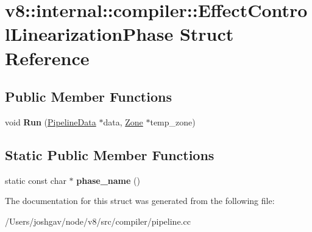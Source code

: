\hypertarget{structv8_1_1internal_1_1compiler_1_1_effect_control_linearization_phase}{}\section{v8\+:\+:internal\+:\+:compiler\+:\+:Effect\+Control\+Linearization\+Phase Struct Reference}
\label{structv8_1_1internal_1_1compiler_1_1_effect_control_linearization_phase}
\subsection*{Public Member Functions}
\begin{DoxyCompactItemize}
\item 
void {\bfseries Run} (\hyperlink{classv8_1_1internal_1_1compiler_1_1_pipeline_data}{Pipeline\+Data} $\ast$data, \hyperlink{classv8_1_1internal_1_1_zone}{Zone} $\ast$temp\+\_\+zone)\hypertarget{structv8_1_1internal_1_1compiler_1_1_effect_control_linearization_phase_ac70bbeaf7ea05b8135044605b4eb6a99}{}\label{structv8_1_1internal_1_1compiler_1_1_effect_control_linearization_phase_ac70bbeaf7ea05b8135044605b4eb6a99}

\end{DoxyCompactItemize}
\subsection*{Static Public Member Functions}
\begin{DoxyCompactItemize}
\item 
static const char $\ast$ {\bfseries phase\+\_\+name} ()\hypertarget{structv8_1_1internal_1_1compiler_1_1_effect_control_linearization_phase_ab9da34ba495ade47eb7a44a251531b72}{}\label{structv8_1_1internal_1_1compiler_1_1_effect_control_linearization_phase_ab9da34ba495ade47eb7a44a251531b72}

\end{DoxyCompactItemize}


The documentation for this struct was generated from the following file\+:\begin{DoxyCompactItemize}
\item 
/\+Users/joshgav/node/v8/src/compiler/pipeline.\+cc\end{DoxyCompactItemize}
